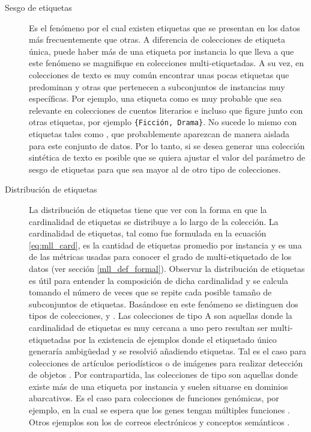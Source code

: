\begin{description} \label{mll_fenomenos}

	\item[Sesgo de etiquetas] Es el fenómeno por el cual existen etiquetas que se
	      presentan en los datos más frecuentemente que otras. A diferencia de
	      colecciones de etiqueta única, puede haber más de una etiqueta por
	      instancia lo que lleva a que este fenómeno se magnifique en colecciones
	      multi-etiquetadas. A su vez, en colecciones de texto es muy común
	      encontrar unas pocas etiquetas que predominan y otras que pertenecen a
	      subconjuntos de instancias muy específicas. Por ejemplo, una etiqueta como
	       es muy probable que sea relevante en
	      colecciones de cuentos literarios e incluso que figure junto con otras
	      etiquetas, por ejemplo \texttt{\{Ficción, Drama\}}.  No sucede lo mismo
	      con etiquetas tales como , que probablemente
	      aparezcan de manera aislada para este conjunto de datos.  Por lo tanto, si
	      se desea generar una colección sintética de texto es posible que se quiera
	      ajustar el valor del parámetro de sesgo de etiquetas para que sea mayor al
	      de otro tipo de colecciones.

	\item[Distribución de etiquetas] La distribución de etiquetas tiene que ver
	      con la forma en que la cardinalidad de etiquetas se distribuye a lo largo
	      de la colección. La cardinalidad de etiquetas, tal como fue formulada en
	      la ecuación \ref{eq:mll_card}, es la cantidad de etiquetas promedio por
	      instancia y es una de las métricas usadas para conocer el grado de
	      multi-etiquetado de los datos (ver sección \ref{mll_def_formal}). Observar
	      la distribución de etiquetas es útil para entender la composición de dicha
	      cardinalidad y se calcula tomando el número de veces que se repite cada
	      posible tamaño de subconjuntos de etiquetas. Basándose en este fenómeno se
	      distinguen dos tipos de colecciones,  y . Las
	      colecciones de tipo A son aquellas donde la cardinalidad de etiquetas es
	      muy cercana a uno pero resultan ser multi-etiquetadas por la existencia de
	      ejemplos donde el etiquetado único generaría ambigüedad y se resolvió
	      añadiendo etiquetas. Tal es el caso para colecciones de artículos
	      periodísticos \cite{lang_newsweeder_1995} o de imágenes para realizar
	      detección de objetos \cite{boutell_learning_2004}. Por contrapartida, las
	      colecciones de tipo  son aquellas donde existe más de una
	      etiqueta por instancia y suelen situarse en dominios abarcativos. Es el
	      caso para colecciones de funciones genómicas, por ejemplo, en la cual se
	      espera que los genes tengan múltiples funciones
	      \cite{diplaris_protein_2005}.  Otros ejemplos son los de correos
	      electrónicos \cite{hutchison_enron_2004} y conceptos semánticos
	      \cite{snoek_challenge_2006}.


\end{description}
